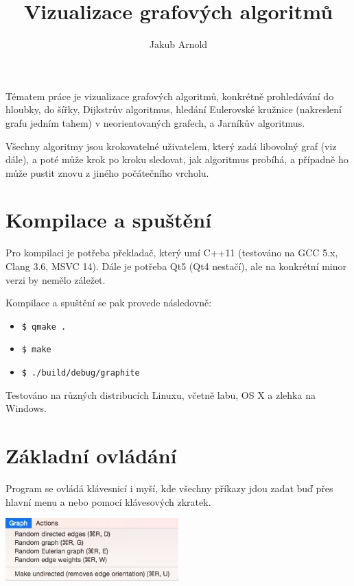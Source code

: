 \documentclass{article}
\title{Vizualizace grafových algoritmů}
\author{Jakub Arnold}
\date{}
\def\code#1{\texttt{#1}}
\begin{document}
\maketitle

Tématem práce je vizualizace grafových algoritmů, konkrétně prohledávání
do hloubky, do šířky, Dijkstrův algoritmus, hledání Eulerovské kružnice (nakreslení grafu jedním tahem)
v neorientovaných grafech, a Jarníkův algoritmus.

Všechny algoritmy jsou krokovatelné uživatelem, který zadá libovolný
graf (viz dále), a poté může krok po kroku sledovat, jak algoritmus
probíhá, a případně ho může pustit znovu z jiného počátečního vrcholu.

\section{Kompilace a spuštění}

Pro kompilaci je potřeba překladač, který umí C++11 (testováno na GCC 5.x, Clang 3.6, MSVC 14).
Dále je potřeba Qt5 (Qt4 nestačí), ale na konkrétní minor verzi by nemělo záležet.

Kompilace a spuštění se pak provede následovně:

\begin{itemize}
  \item \code{\$ qmake .}
  \item \code{\$ make}
  \item \code{\$ ./build/debug/graphite}
\end{itemize}

Testováno na různých distribucích Linuxu, včetně labu, OS X a zlehka na Windows.

\pagebreak

\section{Základní ovládání}

Program se ovládá klávesnicí i myší, kde všechny příkazy jdou zadat buď
přes hlavní menu a nebo pomocí klávesových zkratek.

\begin{center}
    \includegraphics[width=0.5\textwidth]{KJaB5S6.png}
\end{center}
\end{document}
